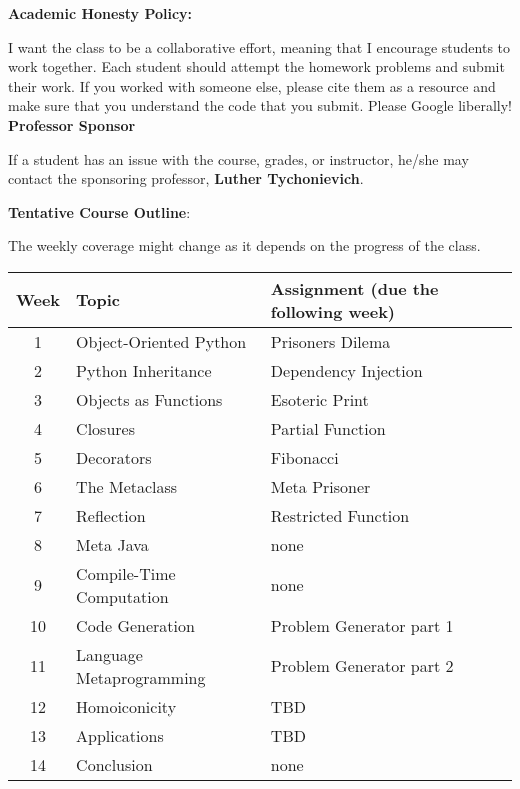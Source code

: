 \documentclass[11pt]{article}
\begin{document}
\textbf {\large Academic Honesty Policy:} 

I want the class to be a collaborative effort, meaning that I encourage students to work together. Each student should attempt the homework problems and submit their work. If you worked with someone else, please cite them as a resource and make sure that you understand the code that you submit. Please Google liberally! 
\\

\textbf {\large Professor Sponsor}

If a student has an issue with the course, grades, or instructor, he/she may contact the sponsoring professor, \textbf{Luther Tychonievich}.

\newpage
\textbf {\large Tentative Course Outline}:

The weekly coverage might change as it depends on the progress of the class. 

\begin{center}
\begin{tabular}{c | l | l}
\textbf{Week} & \textbf{Topic} & \textbf{Assignment} (due the following week)  \\
\hline 1 & Object-Oriented Python  & Prisoners Dilema \\
2 & Python Inheritance & Dependency Injection \\
3 & Objects as Functions & Esoteric Print  \\
4 & Closures & Partial Function\\
5 & Decorators & Fibonacci\\
6 & The Metaclass &  Meta Prisoner\\
7 & Reflection & Restricted Function \\
8 & Meta Java & none \\
9 & Compile-Time Computation &  none\\
10 & Code Generation & Problem Generator part 1 \\
11 & Language Metaprogramming &  Problem Generator part 2 \\
12 & Homoiconicity &  TBD \\
13 & Applications & TBD \\
14 & Conclusion & none
\end{tabular}
\end{center}
\end{document}
